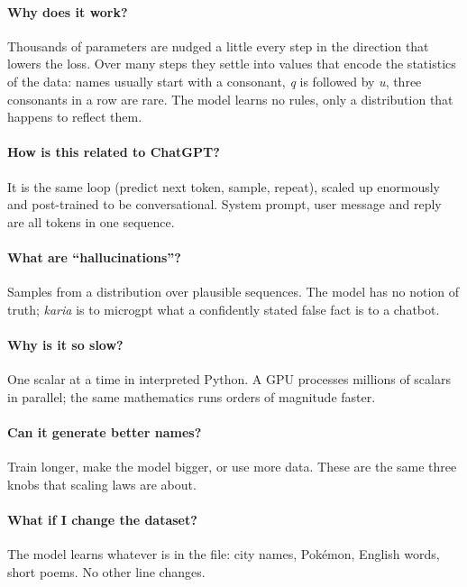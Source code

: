 \documentclass[11pt,letterpaper]{article}
\theoremstyle{remark}
\begin{document}
\paragraph{Why does it work?} Thousands of parameters are nudged a little every step in the direction that lowers the loss. Over many steps they settle into values that encode the statistics of the data: names usually start with a consonant, \emph{q} is followed by \emph{u}, three consonants in a row are rare. The model learns no rules, only a distribution that happens to reflect them.

\paragraph{How is this related to ChatGPT?} It is the same loop (predict next token, sample, repeat), scaled up enormously and post-trained to be conversational. System prompt, user message and reply are all tokens in one sequence.

\paragraph{What are ``hallucinations''?} Samples from a distribution over plausible sequences. The model has no notion of truth; \emph{karia} is to microgpt what a confidently stated false fact is to a chatbot.

\paragraph{Why is it so slow?} One scalar at a time in interpreted Python. A GPU processes millions of scalars in parallel; the same mathematics runs orders of magnitude faster.

\paragraph{Can it generate better names?} Train longer, make the model bigger, or use more data. These are the same three knobs that scaling laws \parencite{kaplan2020scaling,hoffmann2022chinchilla} are about.

\paragraph{What if I change the dataset?} The model learns whatever is in the file: city names, Pok\'emon, English words, short poems. No other line changes.

\end{document}

